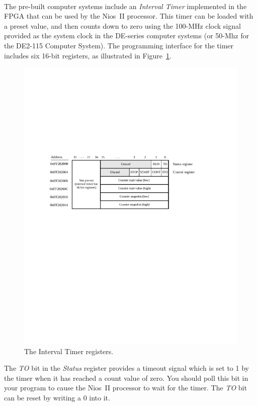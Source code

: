 \documentclass[epsfig,10pt,fullpage]{article}
\begin{document}
~\\
The pre-built computer systems include an {\it Interval Timer} implemented in the FPGA that can be used by
the Nios~II processor. This timer can be loaded with a preset value, and then counts down to 
zero using the 100-MHz clock signal provided as the system clock in the DE-series computer systems (or 50-Mhz for the DE2-115 Computer System). The programming interface 
for the timer includes six 16-bit registers, as illustrated in Figure~\ref{fig:timer}.

\begin{figure}[H]
	\begin{center}
	\includegraphics[scale=1]{figures/figuretimer.pdf}
	\end{center}
	\caption{The Interval Timer registers.}
\label{fig:timer}
\end{figure}

The {\it TO} bit in the {\it Status} register provides a timeout signal which is set to 1 
by the timer when it has reached a count value of zero.  
You should poll this bit in your program to cause the Nios~II processor 
to wait for the timer.  The {\it TO} bit can be reset by writing a 0 into it.  
\end{document}

